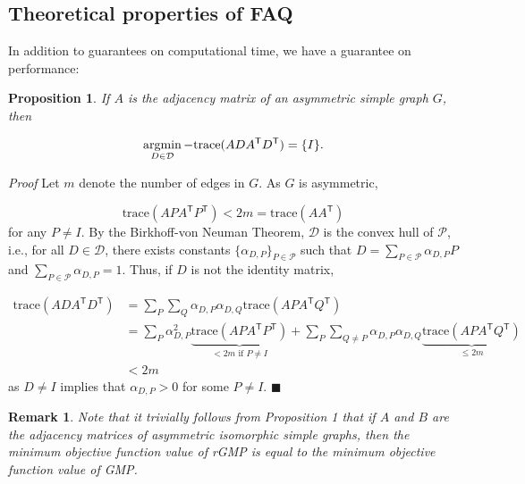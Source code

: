 \documentclass[10pt]{article}
\newtheorem{prop}{Proposition}
\providecommand{\mc}[1]{\mathcal{#1}}
\providecommand{\mc}[1]{\mathcal{#1}}
\newcommand{\T}{^{\ensuremath{\mathsf{T}}}}
\newcommand{\argmin}{\operatornamewithlimits{argmin}}
\newtheorem{rem}{Remark}
\begin{document}
\subsection{Theoretical properties of FAQ}
\label{sub:theory}

In addition to guarantees on computational time, we have a guarantee on performance:  
\begin{prop}
If $A$ is the adjacency matrix of an asymmetric simple graph $G$, then 

$$\argmin_{D\in\mc{D}} -\text{trace}(ADA\T D\T)=\{I\}.$$
\end{prop}
{\it Proof}
Let $m$ denote the number of edges in $G$.  As $G$ is asymmetric,

$$\text{trace}(APA\T P\T)<2m=\text{trace}(AA\T )$$ for any $P\neq I.$  By the Birkhoff-von Neuman Theorem, ${\mathcal D}$ is the convex hull
of $\mc{P}$, i.e., for all $D \in {\mathcal D}$, there exists
constants $\{ \alpha_{D,P} \}_{P \in \mc{P}}$ such that
$D=\sum_{P \in \mc{P}}\alpha_{D,P}P$ and $\sum_{P \in \mc{P}}\alpha_{D,P}=1$.
Thus, if $D$ is not the identity matrix,

\begin{align*}
\text{trace}(ADA\T D\T)&=\sum_{P}\sum_{Q}\alpha_{D,P}\alpha_{D,Q}\text{trace}(APA\T Q\T)\\
&=\sum_{P}\alpha_{D,P}^2\underbrace{\text{trace}(APA\T P\T)}_{<2m\text{ if }P\neq I}+\sum_{P}\sum_{Q\neq P}\alpha_{D,P}\alpha_{D,Q}\underbrace{\text{trace}(APA\T Q\T)}_{\leq 2m}\\
&<2m
\end{align*}
as $D\neq I$ implies that $\alpha_{D,P}>0$ for some $P\neq I$. $\blacksquare$

\begin{rem}
	\emph{Note that it trivially follows from Proposition 1 that if $A$ and $B$ are the adjacency matrices of asymmetric isomorphic simple graphs, then the minimum objective function value of rGMP is equal to the minimum objective function value of GMP.}
\end{rem}
\end{document}
